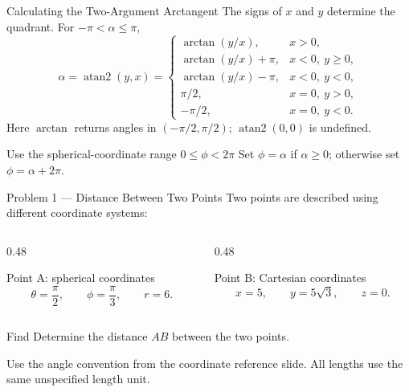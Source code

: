 \begin{frame}{Calculating the Two-Argument Arctangent}
  \small
  The signs of $x$ and $y$ determine the quadrant. For $-\pi<\alpha\le\pi$,
  \[
    \alpha=\operatorname{atan2}(y,x)=
    \begin{cases}
      \arctan(y/x),      & x>0,\\
      \arctan(y/x)+\pi,  & x<0,\ y\ge0,\\
      \arctan(y/x)-\pi,  & x<0,\ y<0,\\
      \pi/2,            & x=0,\ y>0,\\
      -\pi/2,           & x=0,\ y<0.
    \end{cases}
  \]
  Here $\arctan$ returns angles in $(-\pi/2,\pi/2)$;
  $\operatorname{atan2}(0,0)$ is undefined.
  \begin{block}{Use the spherical-coordinate range $0\le\phi<2\pi$}
    Set $\phi=\alpha$ if $\alpha\ge0$; otherwise set $\phi=\alpha+2\pi$.
  \end{block}
\end{frame}

\begin{frame}{Problem 1 — Distance Between Two Points}
  Two points are described using different coordinate systems:
  \begin{columns}[T,onlytextwidth]
    \begin{column}{0.48\textwidth}
      \begin{block}{Point A: spherical coordinates}
        \[
          \theta=\frac{\pi}{2},\qquad \phi=\frac{\pi}{3},\qquad r=6.
        \]
      \end{block}
    \end{column}
    \begin{column}{0.48\textwidth}
      \begin{block}{Point B: Cartesian coordinates}
        \[
          x=5,\qquad y=5\sqrt{3},\qquad z=0.
        \]
      \end{block}
    \end{column}
  \end{columns}
  \begin{block}{Find}
    Determine the distance $AB$ between the two points.
  \end{block}
  \small
  Use the angle convention from the coordinate reference slide.
  All lengths use the same unspecified length unit.
\end{frame}

